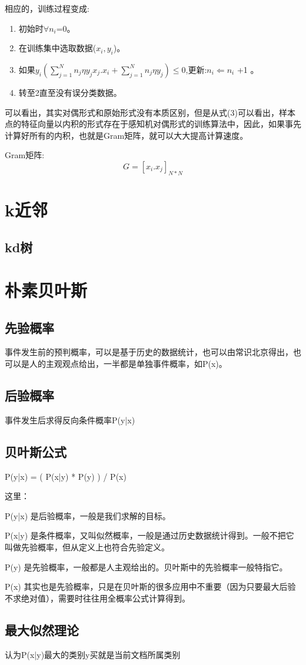 \documentclass[16pt,UTF8]{ctexart}
\begin{document}
\indent 相应的，训练过程变成:
\begin{enumerate}
\item 初始时$\forall n_i$=0。
\item 在训练集中选取数据($x_i,y_i$)。
\item 如果$y_i(\sum_{j=1}^N n_j \eta y_j x_j .x_i + \sum_{j=1}^N n_j \eta y_j) \leq 0$,更新:$n_i \Leftarrow n_i$ +1 。
\item 转至2直至没有误分类数据。
\end{enumerate}
\indent 可以看出，其实对偶形式和原始形式没有本质区别，但是从式(3)可以看出，样本点的特征向量以内积的形式存在于感知机对偶形式的训练算法中，因此，如果事先计算好所有的内积，也就是Gram矩阵，就可以大大提高计算速度。

\indent Gram矩阵:
$$ G = [x_i.x_j]_{N*N}$$

\section{k近邻}
\subsection{kd树}

\section{朴素贝叶斯}
\subsection{先验概率}
事件发生前的预判概率，可以是基于历史的数据统计，也可以由常识北京得出，也可以是人的主观观点给出，一半都是单独事件概率，如P(x)。
\subsection{后验概率}
事件发生后求得反向条件概率P(y|x)
\subsection{ 贝叶斯公式 }
 P(y|x) = ( P(x|y) * P(y) ) / P(x)

这里：

    P(y|x) 是后验概率，一般是我们求解的目标。

    P(x|y) 是条件概率，又叫似然概率，一般是通过历史数据统计得到。一般不把它叫做先验概率，但从定义上也符合先验定义。

    P(y) 是先验概率，一般都是人主观给出的。贝叶斯中的先验概率一般特指它。

    P(x) 其实也是先验概率，只是在贝叶斯的很多应用中不重要（因为只要最大后验不求绝对值），需要时往往用全概率公式计算得到。
\subsection{最大似然理论}
	认为P(x|y)最大的类别y买就是当前文档所属类别
\end{document}
